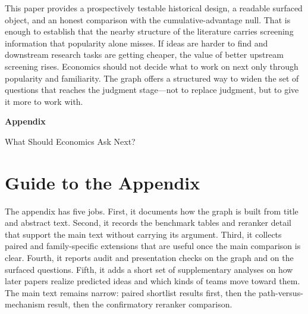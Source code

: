 \documentclass[11pt]{article}
\begin{document}
This paper provides a prospectively testable historical design, a readable surfaced object,
and an honest comparison with the cumulative-advantage null.
That is enough to establish that the nearby structure of the literature carries screening
information that popularity alone misses. If ideas are harder to find and downstream
research tasks are getting cheaper, the value of better upstream screening rises.
Economics should not decide what to work on next only through popularity and familiarity.
The graph offers a structured way to widen the set of questions that reaches the judgment
stage---not to replace judgment, but to give it more to work with.

\appendix
\clearpage

\begin{titlepage}
  \centering
  \vspace*{\fill}
  {\Huge\bfseries Appendix\par}
  \vspace{0.75em}
  {\Large What Should Economics Ask Next?\par}
  \vspace*{\fill}
\end{titlepage}

\section{Guide to the Appendix}
\label{app:appendix-guide}

The appendix has five jobs. First, it documents how the graph is built from title and
abstract text. Second, it records the benchmark tables and reranker detail that support the
main text without carrying its argument. Third, it collects paired and family-specific
extensions that are useful once the main comparison is clear. Fourth, it reports audit and
presentation checks on the graph and on the surfaced questions. Fifth, it adds a short set
of supplementary analyses on how later papers realize predicted ideas and which kinds of
teams move toward them. The main text remains narrow: paired shortlist results first,
then the path-versus-mechanism result, then the confirmatory reranker comparison.
\end{document}
